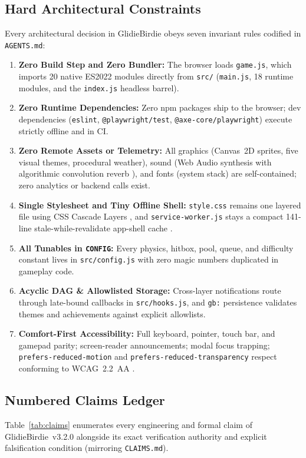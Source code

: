 \documentclass[11pt,letterpaper]{article}
\theoremstyle{remark}
\begin{document}
\subsection{Hard Architectural Constraints}
Every architectural decision in GlidieBirdie obeys seven invariant rules codified in \texttt{AGENTS.md}:
\begin{enumerate}[leftmargin=1.8em, itemsep=1.5pt]
  \item \textbf{Zero Build Step and Zero Bundler:} The browser loads \texttt{game.js}, which imports 20 native ES2022 modules directly from \texttt{src/} (\texttt{main.js}, 18 runtime modules, and the \texttt{index.js} headless barrel).
  \item \textbf{Zero Runtime Dependencies:} Zero npm packages ship to the browser; dev dependencies (\texttt{eslint}, \texttt{@playwright/test}, \texttt{@axe-core/playwright}) execute strictly offline and in CI.
  \item \textbf{Zero Remote Assets or Telemetry:} All graphics (Canvas~2D sprites, five visual themes, procedural weather), sound (Web Audio synthesis with algorithmic convolution reverb \cite{webaudio2021}), and fonts (system stack) are self-contained; zero analytics or backend calls exist.
  \item \textbf{Single Stylesheet and Tiny Offline Shell:} \texttt{style.css} remains one layered file using CSS Cascade Layers \cite{csslayers2022}, and \texttt{service-worker.js} stays a compact 141-line stale-while-revalidate app-shell cache \cite{sw2022}.
  \item \textbf{All Tunables in \texttt{CONFIG}:} Every physics, hitbox, pool, queue, and difficulty constant lives in \texttt{src/config.js} with zero magic numbers duplicated in gameplay code.
  \item \textbf{Acyclic DAG \& Allowlisted Storage:} Cross-layer notifications route through late-bound callbacks in \texttt{src/hooks.js}, and \texttt{gb:} persistence validates themes and achievements against explicit allowlists.
  \item \textbf{Comfort-First Accessibility:} Full keyboard, pointer, touch bar, and gamepad parity; screen-reader announcements; modal focus trapping; \texttt{prefers-\allowbreak reduced-\allowbreak motion} and \texttt{prefers-\allowbreak reduced-\allowbreak transparency} respect conforming to WCAG~2.2~AA \cite{wcag22}.
\end{enumerate}

\subsection{Numbered Claims Ledger}
Table~\ref{tab:claims} enumerates every engineering and formal claim of GlidieBirdie~v3.2.0 alongside its exact verification authority and explicit falsification condition (mirroring \texttt{CLAIMS.md}).
\end{document}
